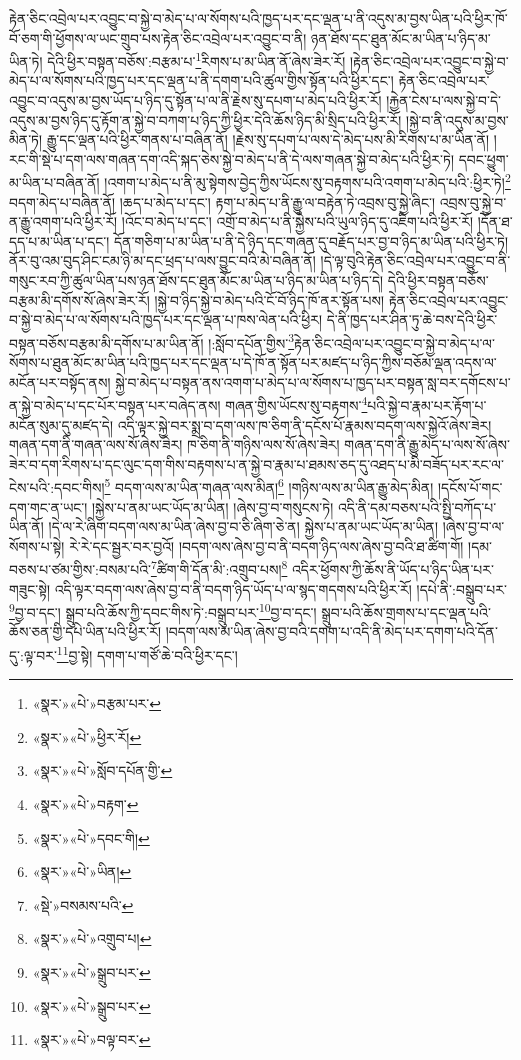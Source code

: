 རྟེན་ཅིང་འབྲེལ་པར་འབྱུང་བ་སྐྱེ་བ་མེད་པ་ལ་སོགས་པའི་ཁྱད་པར་དང་ལྡན་པ་ནི་འདུས་མ་བྱས་ཡིན་པའི་ཕྱིར་ཁོ་བོ་ཅག་གི་ཕྱོགས་ལ་ཡང་གྲུབ་པས་རྟེན་ཅིང་འབྲེལ་པར་འབྱུང་བ་ནི། ཉན་ཐོས་དང་ཐུན་མོང་མ་ཡིན་པ་ཉིད་མ་ཡིན་ཏེ། དེའི་ཕྱིར་བསྟན་བཅོས་:བརྩམ་པ་\footnote{«སྣར་»«པེ་»བརྩམ་པར་}རིགས་པ་མ་ཡིན་ནོ་ཞེས་ཟེར་རོ། །རྟེན་ཅིང་འབྲེལ་པར་འབྱུང་བ་སྐྱེ་བ་མེད་པ་ལ་སོགས་པའི་ཁྱད་པར་དང་ལྡན་པ་ནི་དགག་པའི་ཚུལ་གྱིས་སྟོན་པའི་ཕྱིར་དང་། རྟེན་ཅིང་འབྲེལ་པར་འབྱུང་བ་འདུས་མ་བྱས་ཡོད་པ་ཉིད་དུ་སྟོན་པ་ལ་ནི་རྗེས་སུ་དཔག་པ་མེད་པའི་ཕྱིར་རོ། །རྐྱེན་ངེས་པ་ལས་སྐྱེ་བ་དེ་འདུས་མ་བྱས་ཉིད་དུ་རྟོག་ན་སྐྱེ་བ་བཀག་པ་ཉིད་ཀྱི་ཕྱིར་དེའི་ཆོས་ཉིད་མི་སྲིད་པའི་ཕྱིར་རོ། །སྐྱེ་བ་ནི་འདུས་མ་བྱས་མིན་ཏེ། རྒྱུ་དང་ལྡན་པའི་ཕྱིར་གནས་པ་བཞིན་ནོ། །རྗེས་སུ་དཔག་པ་ལས་དེ་མེད་པས་མི་རིགས་པ་མ་ཡིན་ནོ། །རང་གི་སྡེ་པ་དག་ལས་གཞན་དག་འདི་སྐད་ཅེས་སྐྱེ་བ་མེད་པ་ནི་དེ་ལས་གཞན་སྐྱེ་བ་མེད་པའི་ཕྱིར་ཏེ། དབང་ཕྱུག་མ་ཡིན་པ་བཞིན་ནོ། །འགག་པ་མེད་པ་ནི་མུ་སྟེགས་བྱེད་ཀྱིས་ཡོངས་སུ་བརྟགས་པའི་འགག་པ་མེད་པའི་:ཕྱིར་ཏེ།\footnote{«སྣར་»«པེ་»ཕྱིར་རོ།} བདག་མེད་པ་བཞིན་ནོ། །ཆད་པ་མེད་པ་དང་། རྟག་པ་མེད་པ་ནི་རྒྱུ་ལ་བརྟེན་ཏེ་འབྲས་བུ་སྐྱེ་ཞིང་། འབྲས་བུ་སྐྱེ་བ་ན་རྒྱུ་འགག་པའི་ཕྱིར་རོ། །འོང་བ་མེད་པ་དང་། འགྲོ་བ་མེད་པ་ནི་སྐྱེས་པའི་ཡུལ་ཉིད་དུ་འཇིག་པའི་ཕྱིར་རོ། །དོན་ཐ་དད་པ་མ་ཡིན་པ་དང་། དོན་གཅིག་པ་མ་ཡིན་པ་ནི་དེ་ཉིད་དང་གཞན་དུ་བརྗོད་པར་བྱ་བ་ཉིད་མ་ཡིན་པའི་ཕྱིར་ཏེ། ནོར་བུ་འམ་བུད་ཤིང་ངམ་ཉི་མ་དང་ཕྲད་པ་ལས་བྱུང་བའི་མེ་བཞིན་ནོ། །དེ་ལྟ་བུའི་རྟེན་ཅིང་འབྲེལ་པར་འབྱུང་བ་ནི་གསུང་རབ་ཀྱི་ཚུལ་ཡིན་པས་ཉན་ཐོས་དང་ཐུན་མོང་མ་ཡིན་པ་ཉིད་མ་ཡིན་པ་ཉིད་དེ། དེའི་ཕྱིར་བསྟན་བཅོས་བརྩམ་མི་དགོས་སོ་ཞེས་ཟེར་རོ། །སྐྱེ་བ་ཉིད་སྐྱེ་བ་མེད་པའི་ངོ་བོ་ཉིད་ཁོ་ནར་སྟོན་པས། རྟེན་ཅིང་འབྲེལ་པར་འབྱུང་བ་སྐྱེ་བ་མེད་པ་ལ་སོགས་པའི་ཁྱད་པར་དང་ལྡན་པ་ཁས་ལེན་པའི་ཕྱིར། དེ་ནི་ཁྱད་པར་ཤིན་ཏུ་ཆེ་བས་དེའི་ཕྱིར་བསྟན་བཅོས་བརྩམ་མི་དགོས་པ་མ་ཡིན་ནོ། །:སློབ་དཔོན་གྱིས་\footnote{«སྣར་»«པེ་»སློབ་དཔོན་གྱི་}རྟེན་ཅིང་འབྲེལ་པར་འབྱུང་བ་སྐྱེ་བ་མེད་པ་ལ་སོགས་པ་ཐུན་མོང་མ་ཡིན་པའི་ཁྱད་པར་དང་ལྡན་པ་དེ་ཁོ་ན་སྟོན་པར་མཛད་པ་ཉིད་ཀྱིས་བཅོམ་ལྡན་འདས་ལ་མངོན་པར་བསྟོད་ནས། སྐྱེ་བ་མེད་པ་བསྟན་ནས་འགག་པ་མེད་པ་ལ་སོགས་པ་ཁྱད་པར་བསྟན་སླ་བར་དགོངས་པ་ན་སྐྱེ་བ་མེད་པ་དང་པོར་བསྟན་པར་བཞེད་ནས། གཞན་གྱིས་ཡོངས་སུ་བརྟགས་\footnote{«སྣར་»«པེ་»བརྟག་}པའི་སྐྱེ་བ་རྣམ་པར་རྟོག་པ་མངོན་སུམ་དུ་མཛད་དེ། འདི་ལྟར་སྐྱེ་བར་སྨྲ་བ་དག་ལས་ཁ་ཅིག་ནི་དངོས་པོ་རྣམས་བདག་ལས་སྐྱེའོ་ཞེས་ཟེར། གཞན་དག་ནི་གཞན་ལས་སོ་ཞེས་ཟེར། ཁ་ཅིག་ནི་གཉིས་ལས་སོ་ཞེས་ཟེར། གཞན་དག་ནི་རྒྱུ་མེད་པ་ལས་སོ་ཞེས་ཟེར་བ་དག་རིགས་པ་དང་ལུང་དག་གིས་བརྟགས་པ་ན་སྐྱེ་བ་རྣམ་པ་ཐམས་ཅད་དུ་འཐད་པ་མི་བཟོད་པར་རང་ལ་ངེས་པའི་:དབང་གིས།\footnote{«སྣར་»«པེ་»དབང་གི།} བདག་ལས་མ་ཡིན་གཞན་ལས་མིན།\footnote{«སྣར་»«པེ་»ཡིན།} །གཉིས་ལས་མ་ཡིན་རྒྱུ་མེད་མིན། །དངོས་པོ་གང་དག་གང་ན་ཡང་། །སྐྱེས་པ་ནམ་ཡང་ཡོད་མ་ཡིན། །ཞེས་བྱ་བ་གསུངས་ཏེ། འདི་ནི་དམ་བཅས་པའི་སྤྱི་བཀོད་པ་ཡིན་ནོ། །དེ་ལ་རེ་ཞིག་བདག་ལས་མ་ཡིན་ཞེས་བྱ་བ་ཅི་ཞིག་ཅེ་ན། སྐྱེས་པ་ནམ་ཡང་ཡོད་མ་ཡིན། །ཞེས་བྱ་བ་ལ་སོགས་པ་སྟེ། རེ་རེ་དང་སྦྱར་བར་བྱའོ། །བདག་ལས་ཞེས་བྱ་བ་ནི་བདག་ཉིད་ལས་ཞེས་བྱ་བའི་ཐ་ཚིག་གོ། །དམ་བཅས་པ་ཙམ་གྱིས་:བསམ་པའི་\footnote{«སྡེ་»བསམས་པའི་}ཚིག་གི་དོན་མི་:འགྲུབ་པས།\footnote{«སྣར་»«པེ་»འགྲུབ་པ།} འདིར་ཕྱོགས་ཀྱི་ཆོས་ནི་ཡོད་པ་ཉིད་ཡིན་པར་གཟུང་སྟེ། འདི་ལྟར་བདག་ལས་ཞེས་བྱ་བ་ནི་བདག་ཉིད་ཡོད་པ་ལ་སྙད་གདགས་པའི་ཕྱིར་རོ། །དཔེ་ནི་:བསྒྲུབ་པར་\footnote{«སྣར་»«པེ་»སྒྲུབ་པར་}བྱ་བ་དང་། སྒྲུབ་པའི་ཆོས་ཀྱི་དབང་གིས་ཏེ་:བསྒྲུབ་པར་\footnote{«སྣར་»«པེ་»སྒྲུབ་པར་}བྱ་བ་དང་། སྒྲུབ་པའི་ཆོས་གྲགས་པ་དང་ལྡན་པའི་ཆོས་ཅན་གྱི་དཔེ་ཡིན་པའི་ཕྱིར་རོ། །བདག་ལས་མ་ཡིན་ཞེས་བྱ་བའི་དགག་པ་འདི་ནི་མེད་པར་དགག་པའི་དོན་དུ་:ལྟ་བར་\footnote{«སྣར་»«པེ་»བལྟ་བར་}བྱ་སྟེ། དགག་པ་གཙོ་ཆེ་བའི་ཕྱིར་དང་། 
